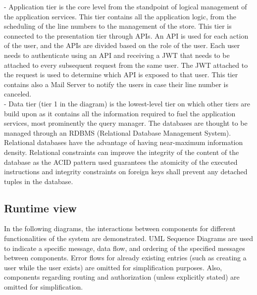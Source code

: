 - Application tier is the core level from the standpoint of logical management of the application services.
This tier contains all the application logic, from the scheduling of the line numbers to the management of the store.
This tier is connected to the presentation tier through APIs.
An API is used for each action of the user, and the APIs are divided based on the role of the user.
Each user needs to authenticate using an API and receiving a JWT that needs to be attached to every subsequent request from the same user.
The JWT attached to the request is used to determine which API is exposed to that user.
This tier contains also a Mail Server to notify the users in case their line number is canceled. \\

- Data tier (tier 1 in the diagram) is the lowest-level tier on which other tiers are build upon as it contains all the information required to fuel the application services, most prominently the query manager. The databases are thought to be managed through an RDBMS
(Relational Database Management System).
Relational databases have the advantage of having near-maximum information density.
Relational constraints can improve the integrity of the content of the database as the ACID pattern used guarantees the atomicity of the executed instructions and integrity constraints on foreign keys shall prevent any detached tuples in the database.

\subsection{Runtime view}

In the following diagrams, the interactions between components for different functionalities of the system are demonstrated.
UML Sequence Diagrams are used to indicate a specific message, data flow, and ordering of the specified messages between components.
Error flows for already existing entries (such as creating a user while the user exists) are omitted for simplification purposes.
Also, components regarding routing and authorization (unless explicitly stated) are omitted for simplification.

